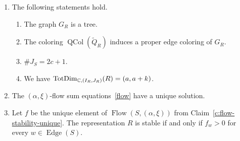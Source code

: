 \begin{lemma}
\begin{enumerate}
\item\label{c:flow-stability-tree} The following statements hold.
\begin{enumerate}[label=(\alph*),ref=\theenumi(\alph*)]
\item\label{c:flow-stability-support-tree} The graph $G_R$ is a tree.
\item\label{c:flow-stability-support-colors} The coloring $\operatorname{QCol}(\widetilde Q_R)$ induces a proper edge coloring of $G_R$.
\item\label{c:flow-stability-block-count} $\#J_{S}=2c+1$.
\item\label{c:flow-stability-total-dimension} We have $\operatorname{TotDim}_{\mathbb C,(I_R,J_R)}(R)=(a,a+k)$.
\end{enumerate}
\item\label{c:flow-stability-unique} The $(\alpha,\xi)$-flow sum equations~\eqref{flow} have a unique solution.
\item\label{c:flow-stability-positive} Let $f$ be the unique element of $\operatorname{Flow}(S,(\alpha,\xi))$ from Claim~\ref{c:flow-stability-unique}.
The representation $R$ is stable if and only if $f_w>0$ for every $w\in\operatorname{Edge}(S)$.
\end{enumerate}
\end{lemma}
